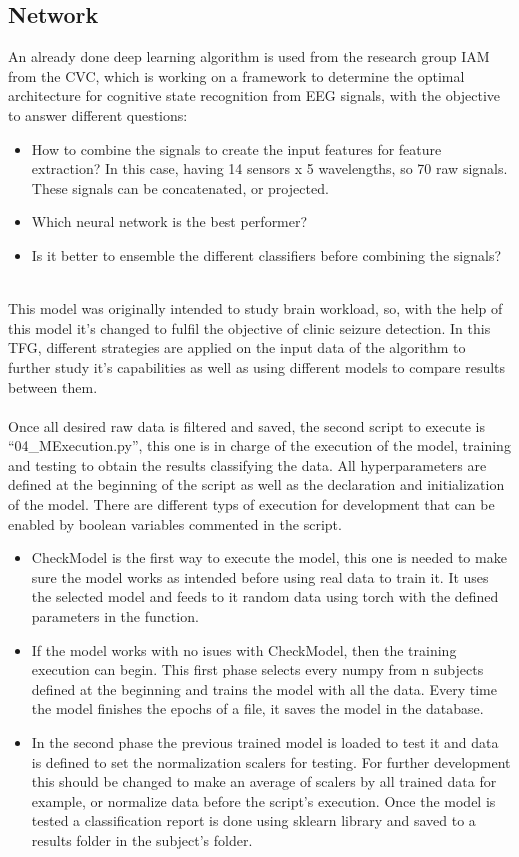 \subsection{Network}
An already done deep learning algorithm is used from the research group IAM from the CVC, which is working on a framework to determine the optimal architecture for cognitive state recognition from EEG signals, with the objective to answer different questions:
\\
\begin{itemize}
  \item How to combine the signals to create the input features for feature extraction? In this case, having 14 sensors x 5 wavelengths, so 70 raw signals. These signals can be concatenated, or projected.
  \item Which neural network is the best performer?
  \item Is it better to ensemble the different classifiers before combining the signals?
\end{itemize}
\leavevmode\\
This model was originally intended to study brain workload, so, with the help of this model it’s changed to fulfil the objective of clinic seizure detection. In this TFG, different strategies are applied on the input data of the algorithm to further study it’s capabilities as well as using different models to compare results between them.
\\\\
Once all desired raw data is filtered and saved, the second script to execute is “04\_MExecution.py”, this one is in charge of the execution of the model, training and testing to obtain the results classifying the data. All hyperparameters are defined at the beginning of the script as well as the declaration and initialization of the model. There are different typs of execution for development that can be enabled by boolean variables commented in the script. 
\\
\begin{itemize}
  \item CheckModel is the first way to execute the model, this one is needed to make sure the model works as intended before using real data to train it. It uses the selected model and feeds to it random data using torch with the defined parameters in the function.
  \item If the model works with no isues with CheckModel, then the training execution can begin. This first phase selects every numpy from n subjects defined at the beginning and trains the model with all the data. Every time the model finishes the epochs of a file, it saves the model in the database.
  \item In the second phase the previous trained model is loaded to test it and data is defined to set the normalization scalers for testing. For further development this should be changed to make an average of scalers by all trained data for example, or normalize data before the script’s execution. Once the model is tested a classification report is done using sklearn library and saved to a results folder in the subject’s folder.
\end{itemize}

